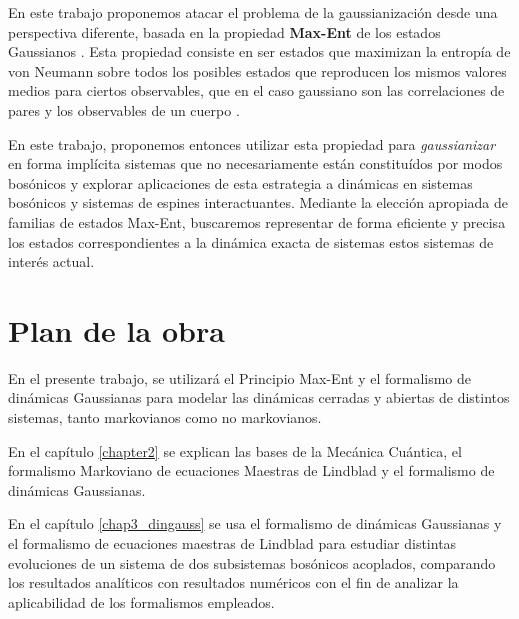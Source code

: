\documentclass{report} %
\numberwithin{equation}{section}
\begin{document}
En este trabajo proponemos atacar el problema de la gaussianización desde una perspectiva diferente, basada en la propiedad \textbf{Max-Ent} de los estados Gaussianos \cite{Jaynes1, Jaynes2,RP.89,rossignoli1990extmf}. Esta propiedad consiste en ser estados que maximizan la entrop\'ia de von Neumann sobre todos los posibles estados que reproducen los mismos valores medios para ciertos observables, que en el caso gaussiano son las correlaciones de pares y los observables de un cuerpo \cite{Nielsen.00}.

En este trabajo, proponemos entonces utilizar esta propiedad para \emph{gaussianizar} en forma implícita sistemas que no necesariamente están constituídos por modos bosónicos
y explorar aplicaciones de esta estrategia a dinámicas en sistemas bosónicos y sistemas de espines interactuantes. Mediante la elección apropiada de familias de estados Max-Ent, buscaremos representar de forma eficiente y precisa los estados correspondientes a la dinámica exacta de sistemas estos sistemas de interés actual. 

\section*{Plan de la obra}


En el presente trabajo, se utilizará el Principio Max-Ent y el formalismo de dinámicas Gaussianas para modelar las dinámicas cerradas y abiertas de distintos sistemas, tanto markovianos como no markovianos.

En el capítulo \ref{chapter2} se explican las bases de la Mecánica Cuántica, el formalismo Markoviano de ecuaciones Maestras de Lindblad y el formalismo de dinámicas Gaussianas.

En el capítulo \ref{chap3_dingauss} se usa el formalismo de dinámicas Gaussianas y el formalismo de ecuaciones maestras de Lindblad para estudiar distintas evoluciones de un sistema de dos subsistemas bosónicos acoplados, comparando los resultados analíticos con resultados numéricos con el fin de analizar la aplicabilidad de los formalismos empleados.
\end{document}
